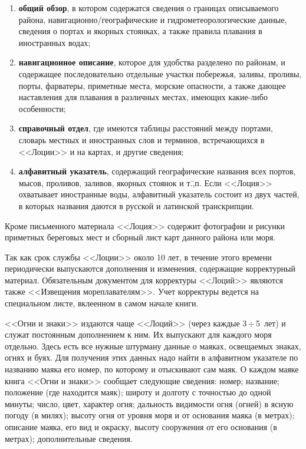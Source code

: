\documentclass[a4paper, 12pt, twoside, final, book, russian, fittopage, cyremdash]{ncc}
\newcommand{\otdo}{\,\ensuremath{\div}\,}
\begin{document}
\begin{enumerate}
\item \textbf{общий обзор}, в котором содержатся сведения о границах описываемого района, навигационно\-/географические и гидрометеорологические данные, сведения о портах и якорных стоянках, а также правила плавания в иностранных водах; 
\item \textbf{навигационное описание}, которое для удобства разделено по районам, и содержащее последовательно отдельные участки побережья, заливы, проливы, порты, фарватеры, приметные места, морские опасности, а также дающее наставления для плавания в различных местах, имеющих какие-либо особенности;
\item \textbf{справочный отдел}, где имеются таблицы расстояний между портами, словарь местных и иностранных слов и терминов, встречающихся в <<Лоции>> и на картах, и другие сведения; 
\item \textbf{алфавитный указатель}, содержащий географические названия всех портов, мысов, проливов, заливов, якорных стоянок и т.\=,п. Если <<Лоция>> охватывает иностранные воды, алфавитный указатель состоит из двух частей, в которых названия даются в русской и латинской транскрипции. 
\end{enumerate}

Кроме письменного материала <<Лоция>> содержит фотографии и рисунки приметных береговых мест и сборный лист карт данного района или моря. 

Так как срок службы <<Лоции>> около 10 лет, в течение этого времени периодически выпускаются дополнения и изменения, содержащие корректурный материал. Обязательным документом для корректуры <<Лоций>> являются также <<Извещения мореплавателям>>. Учет корректуры ведется на специальном листе, вклеенном в самом начале книги. 

<<Огни и знаки>> издаются чаще <<Лоций>> (через каждые 3\otdo 5~лет) и служат постоянным дополнением к ним. Их выпускают для каждого моря отдельно. Здесь есть все нужные штурману данные о маяках, освещаемых знаках, огнях и буях. Для получения этих данных надо найти в алфавитном указателе по названию маяка его номер, по которому и отыскивают сам маяк. О каждом маяке книга <<Огни и знаки>> сообщает следующие сведения: номер; название; положение (где находится маяк); широту и долготу с точностью до одной минуты; число, цвет, характер огня; дальность видимости огня (огней) в ясную погоду (в милях); высоту огня от уровня моря и от основания маяка (в метрах); описание маяка, его вид и окраску, высоту сооружения от его основания (в метрах); дополнительные сведения. 
\end{document}
